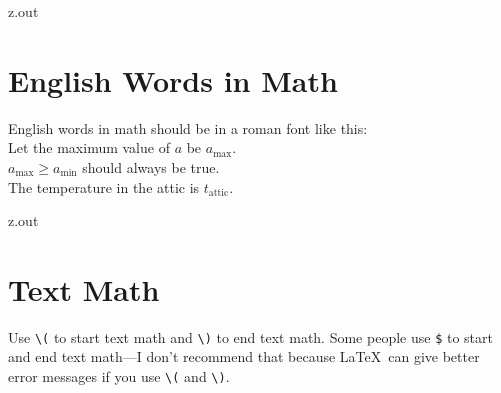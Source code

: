\MyIO


\begin{VerbatimOut}{z.out}
\newpage

\section{English Words in Math}

English words in math should be in a roman font like this:\\
Let the maximum value of \(a\) be \(a_\text{max}\).\\
\(a_\text{max} \ge a_\text{min}\) should always be true.\\
The temperature in the attic is \(t_\text{attic}\).
\end{VerbatimOut}

\MyIO


\begin{VerbatimOut}{z.out}
\section{Text Math}

Use \verb+\(+ to start text math and \verb+\)+ to end text math.
Some people use \verb+$+ to start and end text math---I don't
recommend that because \LaTeX\ can give better error messages
if you use \verb+\(+ and \verb+\)+.
\end{VerbatimOut}

\MyIO


